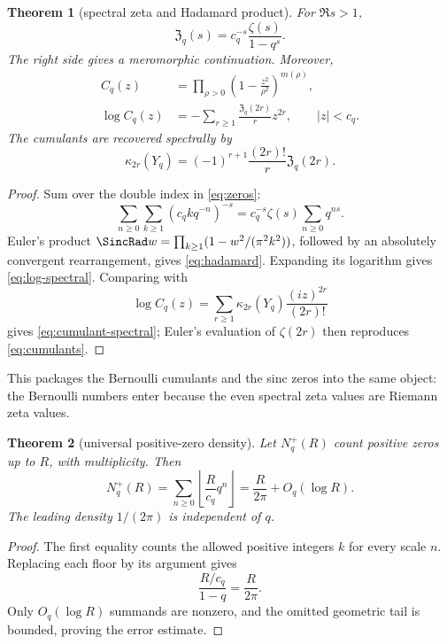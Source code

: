 \documentclass[11pt]{article}
\newtheorem{theorem}{Theorem}[section]
\theoremstyle{definition}
\theoremstyle{remark}
\begin{document}
\begin{theorem}[spectral zeta and Hadamard product]\label{thm:spectral-zeta}
For $\Re s>1$,
\begin{equation}\label{eq:spectral-zeta}
 \boxed{\quad
 \mathfrak Z_q(s)=c_q^{-s}\frac{\zeta(s)}{1-q^s}.
 \quad}
\end{equation}
The right side gives a meromorphic continuation.  Moreover,
\begin{align}
 C_q(z)&=\prod_{\rho>0}\left(1-\frac{z^2}{\rho^2}\right)^{m(\rho)},
 \label{eq:hadamard}\\
 \log C_q(z)&=-\sum_{r\ge1}\frac{\mathfrak Z_q(2r)}{r}z^{2r},
 \qquad |z|<c_q.
 \label{eq:log-spectral}
\end{align}
The cumulants are recovered spectrally by
\begin{equation}\label{eq:cumulant-spectral}
 \kappa_{2r}(Y_q)=(-1)^{r+1}\frac{(2r)!}{r}\mathfrak Z_q(2r).
\end{equation}
\end{theorem}

\begin{proof}
Sum over the double index in \cref{eq:zeros}:
\[
 \sum_{n\ge0}\sum_{k\ge1}(c_qkq^{-n})^{-s}
 =c_q^{-s}\zeta(s)\sum_{n\ge0}q^{ns}.
\]
Euler's product $\SincRad w=\prod_{k\ge1}(1-w^2/(\pi^2k^2))$, followed by an absolutely convergent rearrangement, gives \cref{eq:hadamard}.  Expanding its logarithm gives \cref{eq:log-spectral}.  Comparing with
\[
 \log C_q(z)=\sum_{r\ge1}\kappa_{2r}(Y_q)\frac{(iz)^{2r}}{(2r)!}
\]
gives \cref{eq:cumulant-spectral}; Euler's evaluation of $\zeta(2r)$ then reproduces \cref{eq:cumulants}.
\end{proof}

This packages the Bernoulli cumulants and the sinc zeros into the same object: the Bernoulli numbers enter because the even spectral zeta values are Riemann zeta values.

\begin{theorem}[universal positive-zero density]\label{thm:zero-count-general}
Let $N_q^+(R)$ count positive zeros up to $R$, with multiplicity.  Then
\begin{equation}\label{eq:zero-count-floor}
 N_q^+(R)=\sum_{n\ge0}\left\lfloor\frac{R}{c_q}q^n\right\rfloor
 =\frac{R}{2\pi}+O_q(\log R).
\end{equation}
The leading density $1/(2\pi)$ is independent of $q$.
\end{theorem}

\begin{proof}
The first equality counts the allowed positive integers $k$ for every scale $n$.  Replacing each floor by its argument gives
\[
 \frac{R/c_q}{1-q}=\frac{R}{2\pi}.
\]
Only $O_q(\log R)$ summands are nonzero, and the omitted geometric tail is bounded, proving the error estimate.
\end{proof}
\end{document}
